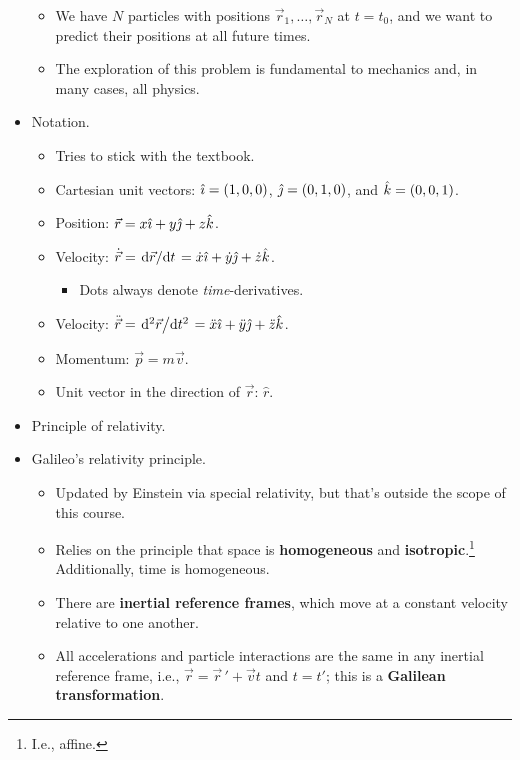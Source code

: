 \documentclass[../notes.tex]{subfiles}
\begin{document}
\begin{itemize}
    \begin{itemize}
        \item We have $N$ particles with positions $\vec{r}_1,\dots,\vec{r}_N$ at $t=t_0$, and we want to predict their positions at all future times.
        \item The exploration of this problem is fundamental to mechanics and, in many cases, all physics.
    \end{itemize}
    \item Notation.
    \begin{itemize}
        \item Tries to stick with the textbook.
        \item Cartesian unit vectors: $\hat{\imath}=(1,0,0)$, $\hat{\jmath}=(0,1,0)$, and $\hat{k}=(0,0,1)$.
        \item Position: $\vec{r}=x\hat{\imath}+y\hat{\jmath}+z\hat{k}$.
        \item Velocity: $\dot{\vec{r}}=\dv*{\vec{r}}{t}=\dot{x}\hat{\imath}+\dot{y}\hat{\jmath}+\dot{z}\hat{k}$.
        \begin{itemize}
            \item Dots always denote \emph{time}-derivatives.
        \end{itemize}
        \item Velocity: $\ddot{\vec{r}}=\dv*[2]{\vec{r}}{t}=\ddot{x}\hat{\imath}+\ddot{y}\hat{\jmath}+\ddot{z}\hat{k}$.
        \item Momentum: $\vec{p}=m\vec{v}$.
        \item Unit vector in the direction of $\vec{r}$: $\hat{r}$.
    \end{itemize}
    \item Principle of relativity.
    \item Galileo's relativity principle.
    \begin{itemize}
        \item Updated by Einstein via special relativity, but that's outside the scope of this course.
        \item Relies on the principle that space is \textbf{homogeneous} and \textbf{isotropic}.\footnote{I.e., affine.} Additionally, time is homogeneous.
        \item There are \textbf{inertial reference frames}, which move at a constant velocity relative to one another.
        \item All accelerations and particle interactions are the same in any inertial reference frame, i.e., $\vec{r}=\vec{r}{\,}'+\vec{v}t$ and $t=t'$; this is a \textbf{Galilean transformation}.

\end{itemize}
\end{itemize}
\end{document}
